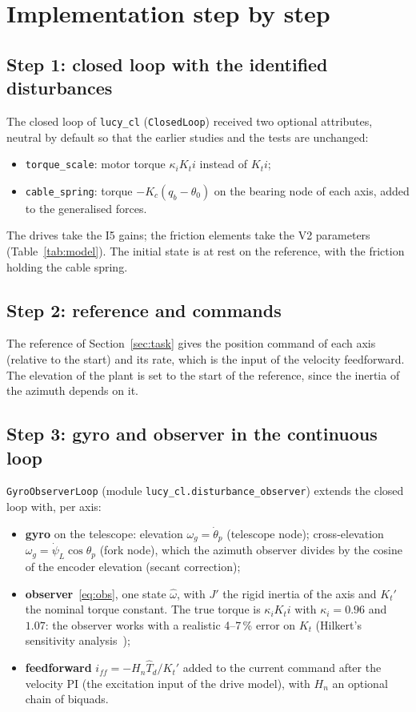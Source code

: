\documentclass[10pt,a4paper]{article}
\numberwithin{equation}{section}
\begin{document}
\section{Implementation step by step}\label{sec:impl}
\subsection{Step 1: closed loop with the identified disturbances}
The closed loop of \texttt{lucy\_cl} (\texttt{ClosedLoop}) received two optional attributes, neutral by default so that the earlier studies and the tests are unchanged:
\begin{itemize}
\item \texttt{torque\_scale}: motor torque $\kappa_iK_ti$ instead of $K_ti$;
\item \texttt{cable\_spring}: torque $-K_c(q_b-\theta_0)$ on the bearing node of each axis, added to the generalised forces.
\end{itemize}
The drives take the I5 gains; the friction elements take the V2 parameters (Table~\ref{tab:model}). The initial state is at rest on the reference, with the friction holding the cable spring.

\subsection{Step 2: reference and commands}
The reference of Section~\ref{sec:task} gives the position command of each axis (relative to the start) and its rate, which is the input of the velocity feedforward. The elevation of the plant is set to the start of the reference, since the inertia of the azimuth depends on it.

\subsection{Step 3: gyro and observer in the continuous loop}
\texttt{GyroObserverLoop} (module \texttt{lucy\_cl.disturbance\_observer}) extends the closed loop with, per axis:
\begin{itemize}
\item \textbf{gyro} on the telescope: elevation $\omega_g=\dot\theta_p$ (telescope node); cross-elevation $\omega_g=\dot\psi_L\cos\theta_p$ (fork node), which the azimuth observer divides by the cosine of the encoder elevation (secant correction);
\item \textbf{observer}~\eqref{eq:obs}, one state $\hat\omega$, with $J'$ the rigid inertia of the axis and $K_t'$ the nominal torque constant. The true torque is $\kappa_iK_ti$ with $\kappa_i=0.96$ and $1.07$: the observer works with a realistic 4--7\,\% error on $K_t$ (Hilkert's sensitivity analysis~\cite[sec.~4]{hilkert2011});
\item \textbf{feedforward} $i_{ff}=-H_n\hat T_d/K_t'$ added to the current command after the velocity PI (the excitation input of the drive model), with $H_n$ an optional chain of biquads.
\end{itemize}
\end{document}
